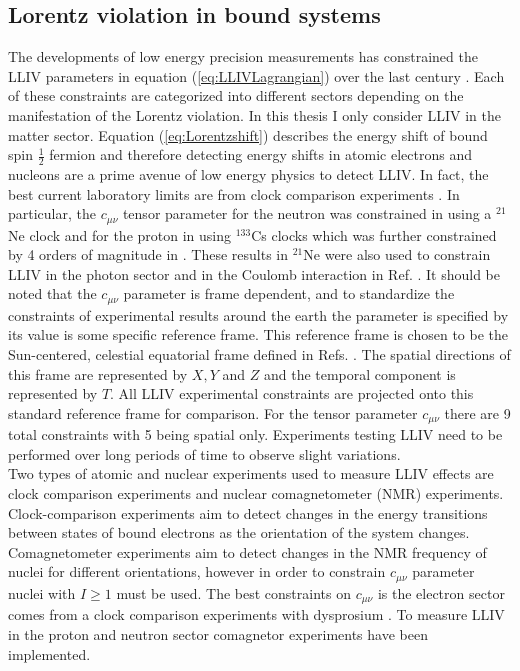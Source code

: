 \documentclass[10pt,a4paper, twoside, openright]{report}
\begin{document}
\subsection{Lorentz violation in bound systems} \label{sec:LorentzBound}
The developments of low energy precision measurements has constrained the LLIV parameters in equation (\ref{eq:LLIVLagrangian}) over the last  century \cite{LorentzDataTables2019}. Each of these constraints are categorized into different sectors depending on the manifestation of the Lorentz violation.  In this thesis I only consider LLIV in the matter sector. Equation (\ref{eq:Lorentzshift}) describes the energy shift of bound spin $\tfrac{1}{2}$ fermion and therefore detecting energy shifts in atomic electrons and nucleons are a prime avenue of low energy physics to detect LLIV. In fact, the best current laboratory limits are from clock comparison experiments \cite{Prestage1985, Chupp1989, Hohensee2013, Dzuba2016}. In particular, the $c_{\mu\nu}$ tensor parameter for the neutron was constrained in \cite{Smiciklas2011} using a $^{21}$Ne clock and for the proton in \cite{Wolf2006} using $^{133}$Cs clocks which was further constrained by 4 orders of magnitude in \cite{Flambaum2016}. These results in $^{21}$Ne were also used to constrain LLIV in the photon sector and in the Coulomb interaction in  Ref. \cite{FlambaumRomalis2017} . It should be noted that the $c_{\mu\nu}$ parameter is frame dependent, and to standardize the constraints of experimental results around the earth the parameter is specified by its value is some specific reference frame. This reference frame is chosen to be the Sun-centered, celestial equatorial frame defined in Refs. \cite{LorentzDataTables2019, Bluhm2002}. The spatial directions of this frame are represented by $X,Y$ and $Z$ and the temporal component is represented by $T$. All LLIV experimental constraints are projected onto this standard reference frame for comparison. For the tensor parameter $c_{\mu\nu}$ there are 9 total constraints with 5 being spatial only. Experiments testing LLIV need to be performed over long periods of time to observe slight variations.\\
\linebreak
Two types of atomic and nuclear experiments used to measure LLIV effects are clock comparison experiments and nuclear comagnetometer (NMR) experiments. Clock-comparison experiments aim to detect changes in the energy transitions between states of bound electrons as the orientation of the system changes. Comagnetometer experiments aim to detect changes in the NMR frequency of nuclei for different orientations, however in order to constrain $c_{\mu\nu}$ parameter nuclei with $I\geq 1$ must be used. The best constraints on $c_{\mu\nu}$ is the electron sector comes from a clock comparison experiments with dysprosium \cite{Hohensee2013}. To measure LLIV in the proton and neutron sector comagnetor experiments have been implemented. \\
\end{document}

